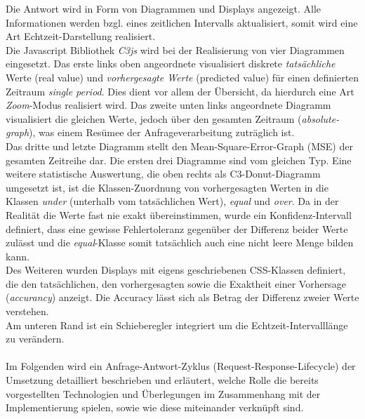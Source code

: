 Die Antwort wird in Form von Diagrammen und Displays angezeigt. Alle Informationen werden bzgl. eines zeitlichen Intervalls aktualisiert, somit wird eine Art Echtzeit-Darstellung realisiert.\\ 
Die Javascript Bibliothek \emph{C3js} wird bei der Realisierung von vier Diagrammen eingesetzt. Das erste links oben angeordnete visualisiert diskrete \emph{tatsächliche} Werte (real value) und \emph{vorhergesagte Werte} (predicted value) für einen definierten Zeitraum \emph{single period}. Dies dient vor allem der Übersicht, da hierdurch eine Art \emph{Zoom}-Modus realisiert wird. Das zweite unten links angeordnete Diagramm visualisiert die gleichen Werte, jedoch über den gesamten Zeitraum (\emph{absolute-graph}), was einem Resümee der Anfrageverarbeitung zuträglich ist.\\
Das dritte und letzte Diagramm stellt den Mean-Square-Error-Graph (MSE) der gesamten Zeitreihe dar. Die ersten drei Diagramme sind vom gleichen Typ. 
Eine weitere statistische Auswertung, die oben rechts als C3-Donut-Diagramm umgesetzt ist, ist die Klassen-Zuordnung von vorhergesagten Werten in die Klassen \emph{under} (unterhalb vom tatsächlichen Wert), \emph{equal} und \emph{over}. Da in der Realität die Werte fast nie exakt übereinstimmen, wurde ein Konfidenz-Intervall definiert, dass eine gewisse Fehlertoleranz gegenüber der Differenz beider Werte zulässt und die \emph{equal}-Klasse somit tatsächlich auch eine nicht leere Menge bilden kann.\\
Des Weiteren wurden Displays mit eigens geschriebenen CSS-Klassen definiert, die den tatsächlichen, den vorhergesagten sowie die Exaktheit einer Vorhersage (\emph{accurancy}) anzeigt. Die Accuracy lässt sich als Betrag der Differenz zweier Werte verstehen. \\
Am unteren Rand ist ein Schieberegler integriert um die Echtzeit-Intervalllänge zu verändern.\\\\


Im Folgenden wird ein Anfrage-Antwort-Zyklus (Request-Response-Lifecycle) der Umsetzung detailliert beschrieben und erläutert, welche Rolle die bereits vorgestellten Technologien und Überlegungen im Zusammenhang mit der Implementierung spielen, sowie wie diese miteinander verknüpft sind.      


